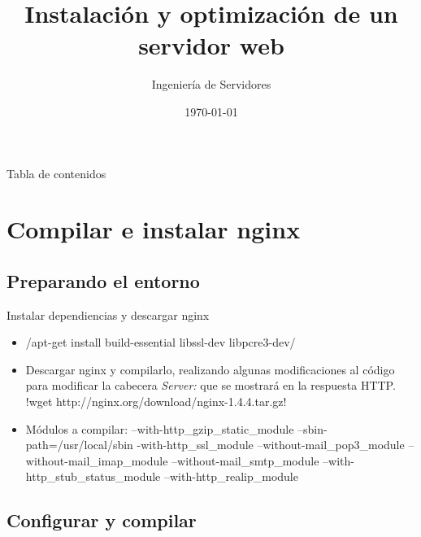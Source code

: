 \documentclass{beamer}
\title{Instalación y optimización de un servidor web}
\subtitle{Ingeniería de Servidores}
\institute[Escuela Técnica Superior Ing. Informática Y Telecomunicaciones] %
{
  Universidad de Granada
}
\date{\today}
\begin{document}
\begin{frame}
  \titlepage
\end{frame}

\begin{frame}{Tabla de contenidos}
  \tableofcontents
\end{frame}

\section{Compilar e instalar nginx}

\subsection{Preparando el entorno}

\begin{frame}{Instalar dependiencias y descargar nginx}{}
  \begin{itemize}
  \item {
       /apt-get install build-essential libssl-dev libpcre3-dev/
       \pause
  }
  \item {
    Descargar nginx y compilarlo, realizando algunas modificaciones al código
    para modificar la cabecera \emph{Server:} que se mostrará en la respuesta HTTP.
    !wget http://nginx.org/download/nginx-1.4.4.tar.gz!
  }
  \item<3-> {
    Módulos a compilar:
    --with-http\_gzip\_static\_module --sbin-path=/usr/local/sbin
    -with-http\_ssl\_module --without-mail\_pop3\_module --without-mail\_imap\_module
    --without-mail\_smtp\_module --with-http\_stub\_status\_module --with-http\_realip\_module
  }
  \end{itemize}
\end{frame}

\subsection{Configurar y compilar}
\end{document}
